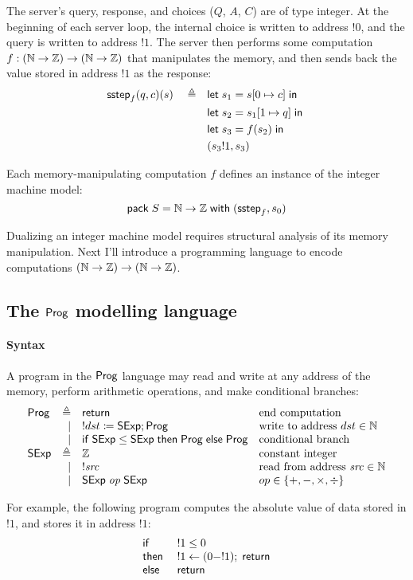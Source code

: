 The server's query, response, and choices ($Q$, $A$, $C$) are of type integer.
At the beginning of each server loop, the internal choice is written to address
$!0$, and the query is written to address $!1$.  The server then performs some
computation $f:(\mathbb N\to\mathbb Z)\to(\mathbb N\to\mathbb Z)$ that manipulates the memory, and
then sends back the value stored in address $!1$ as the response:
\begin{align*}
  \mathsf{sstep}_f(q,c)(s)\quad\triangleq\quad&\mathsf{let}\; s_1=s[0\mapsto c]\;\mathsf{in}\;\\
  &\mathsf{let}\; s_2=s_1[1\mapsto q]\;\mathsf{in}\;\\
  &\mathsf{let}\; s_3=f(s_2)\;\mathsf{in}\;\\
  &(s_3!1,s_3)
\end{align*}

Each memory-manipulating computation $f$ defines an instance of the integer
machine model:
\[\mathsf{pack}\;S=\mathbb N\to\mathbb Z\;\mathsf{with}\;(\mathsf{sstep}_f,s_0)\]

Dualizing an integer machine model requires structural analysis of its memory
manipulation.  Next I'll introduce a programming language to encode computations
$(\mathbb N\to\mathbb Z)\to(\mathbb N\to\mathbb Z)$.

\subsection{The $\mathsf{Prog}$ modelling language}
\label{sec:prog-lang}
\paragraph{Syntax}
A program in the $\mathsf{Prog}$ language may read and write at any address of the
memory, perform arithmetic operations, and make conditional branches:
\[\begin{array}{lrll}
\Prog&\triangleq&\Return&\text{end computation}\\
&\mid&!dst\coloneqq\Sexp;\Prog&\text{write to address }dst\in\Nat\\\null
&\mid&\If\Sexp\le\Sexp\Then\Prog\Else\Prog&\text{conditional branch}\\
\Sexp&\triangleq&\Int&\text{constant integer}\\
&\mid&!\src&\text{read from address }\src\in\Nat\\
&\mid&\Sexp\oop\Sexp&op\in\{+,-,\times,\div\}
\end{array}\]

For example, the following program computes the absolute value of data stored in
$!1$, and stores it in address $!1$:
\[\begin{array}{ll}
  \mathsf{if}\;&!1\le0\\
  \mathsf{then}\;&!1\gets(0-!1);\;\mathsf{return}\\
  \mathsf{else}\;&\mathsf{return}
\end{array}\]


